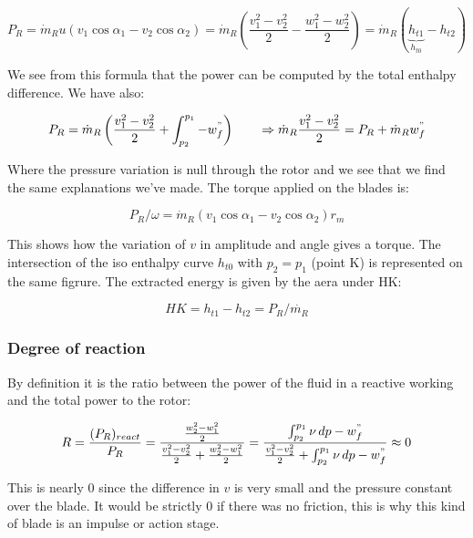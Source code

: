 \begin{equation}
P_R = \dot{m}_R u (v_1\cos \alpha _1 - v_2 \cos \alpha _2) = \dot{m}_R \left(\frac{v_1^2-v_2^2}{2}-\frac{w_1^2-w_2^2}{2}\right) = \dot{m}_R (\underbrace{h_{t1}}_{h_{t0}} - h_{t2})
\end{equation}

We see from this formula that the power can be computed by the total enthalpy difference. We have also: 

\begin{equation}
P_R = \dot{m}_R \left(\frac{v_1^2 -v_2^2}{2} + \int _{p_2}^{p_1} - w^"_f\right) \qquad \Rightarrow \dot{m}_R\frac{v_1^2 -v_2^2}{2} = P_R + \dot{m}_R w^"_f
\end{equation}

Where the pressure variation is null through the rotor and we see that we find the same explanations we've made. The torque applied on the blades is: 

\begin{equation}
P_R/ \omega = \dot{m}_R  (v_1\cos \alpha _1 - v_2 \cos \alpha _2) r_m
\end{equation}

This shows how the variation of $v$ in amplitude and angle gives a torque. The intersection of the iso enthalpy curve $h_{t0}$ with $p_2 = p_1$ (point K) is represented on the same figrure. The extracted energy is given by the aera under HK: 

\begin{equation}
HK = h_{t1} - h_{t2} = P_R/\dot{m_R}
\end{equation}

\subsubsection{Degree of reaction}
By definition it is the ratio between the power of the fluid in a reactive working and the total power to the rotor: 

\begin{equation}
R= \frac{(P_R)_{react}}{P_R} = \frac{\frac{w_2^2 - w_1^2}{2}}{\frac{v_1^2 - v_2^2}{2}+ \frac{w_2^2 - w_1^2}{2}} = \frac{\int _{p_2}^{p_1}\nu\, dp -w^"_f}{\frac{v_1^2 - v_2^2}{2}+ \int _{p_2}^{p_1}\nu\, dp -w^"_f} \approx 0
\end{equation}

This is nearly 0 since the difference in $v$ is very small and the pressure constant over the blade. It would be strictly 0 if there was no friction, this is why this kind of blade is an impulse or action stage. 

